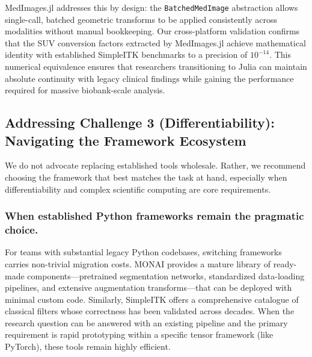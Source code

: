\documentclass[10pt,letterpaper]{article}
\begin{document}
MedImages.jl addresses this by design: the \texttt{BatchedMedImage} abstraction allows single-call, batched geometric transforms to be applied consistently across modalities without manual bookkeeping. Our cross-platform validation confirms that the SUV conversion factors extracted by MedImages.jl achieve mathematical identity with established SimpleITK benchmarks to a precision of $10^{-14}$. This numerical equivalence ensures that researchers transitioning to Julia can maintain absolute continuity with legacy clinical findings while gaining the performance required for massive biobank-scale analysis.

\subsection{Addressing Challenge 3 (Differentiability): Navigating the Framework Ecosystem}
We do not advocate replacing established tools wholesale. Rather, we recommend choosing the framework that best matches the task at hand, especially when differentiability and complex scientific computing are core requirements.

\subsubsection{When established Python frameworks remain the pragmatic choice.}
For teams with substantial legacy Python codebases, switching frameworks carries non-trivial migration costs. MONAI provides a mature library of ready-made components---pretrained segmentation networks, standardized data-loading pipelines, and extensive augmentation transforms---that can be deployed with minimal custom code. Similarly, SimpleITK offers a comprehensive catalogue of classical filters whose correctness has been validated across decades. When the research question can be answered with an existing pipeline and the primary requirement is rapid prototyping within a specific tensor framework (like PyTorch), these tools remain highly efficient.
\end{document}
